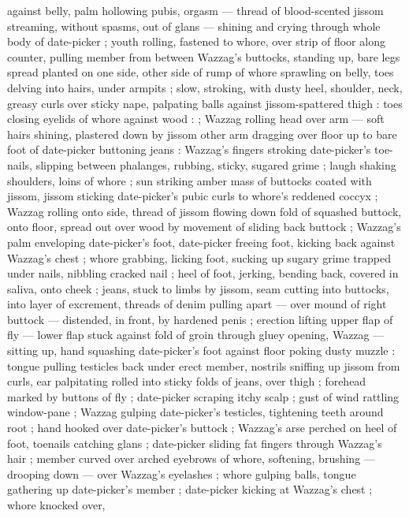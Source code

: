 against belly, palm hollowing pubis, orgasm --- thread of blood-scented jissom streaming, without
spasms, out of glans --- shining and crying through whole body of date-picker ; youth rolling,
fastened to whore, over strip of floor along counter, pulling member from between Wazzag's buttocks,
standing up, bare legs spread planted on one side, other side of rump of whore sprawling on belly,
toes delving into hairs, under armpits ; slow, stroking, with dusty heel, shoulder, neck, greasy
curls over sticky nape, palpating balls against jissom-spattered thigh : toes closing eyelids of
whore against wood : {\td}  ; Wazzag rolling head over arm --- soft hairs shining, plastered down by
jissom {\dashcom} other arm dragging over floor up to bare foot of date-picker buttoning jeans :
Wazzag's fingers stroking date-picker's toe-nails, slipping between phalanges, rubbing, sticky,
sugared grime ; laugh shaking shoulders, loins of whore ; sun striking amber mass of buttocks coated
with jissom, jissom sticking date-picker's pubic curls to whore's reddened coccyx ; Wazzag rolling
onto side, thread of jissom flowing down fold of squashed buttock, onto floor, spread out over wood
by movement of sliding back buttock ; Wazzag's palm enveloping date-picker's foot, date-picker
freeing foot, kicking back against Wazzag's chest ; whore grabbing, licking foot, sucking up sugary
grime trapped under nails, nibbling cracked nail ; heel of foot, jerking, bending back, covered in
saliva, onto cheek ; jeans, stuck to limbs by jissom, seam cutting into buttocks, into layer of
excrement, threads of denim pulling apart --- over mound of right buttock --- distended, in front,
by hardened penis ; erection lifting upper flap of fly --- lower flap stuck against fold of groin
{\dashsemi} through gluey opening, Wazzag --- sitting up, hand squashing date-picker's foot against
floor {\dashcom} poking dusty muzzle : tongue pulling testicles back under erect member, nostrils
sniffing up jissom from curls, ear palpitating rolled into sticky folds of jeans, over thigh ;
forehead marked by buttons of fly ; date-picker scraping itchy scalp ; gust of wind rattling
window-pane ; Wazzag gulping date-picker's testicles, tightening teeth around root ; hand hooked
over date-picker's buttock ; Wazzag's arse perched on heel of foot, toenails catching glans ;
date-picker sliding fat fingers through Wazzag's hair ; member curved over arched eyebrows of whore,
softening, brushing --- drooping down --- over Wazzag's eyelashes ; whore gulping balls, tongue
gathering up date-picker's member ; date-picker kicking at Wazzag's chest ; whore knocked over,
